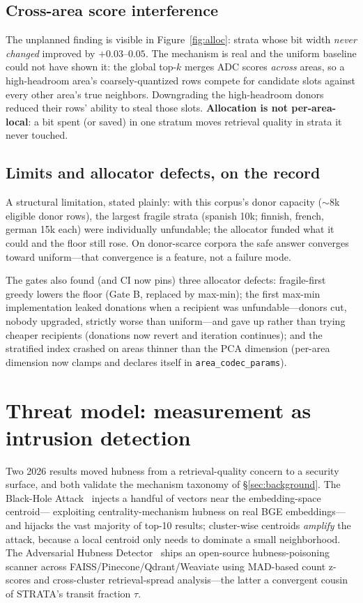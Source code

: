 \documentclass[sigconf, nonacm]{acmart}
\begin{document}
\subsection{Cross-area score interference}
\label{sec:interference}

The unplanned finding is visible in Figure~\ref{fig:alloc}: strata whose
bit width \emph{never changed} improved by $+0.03$--$0.05$. The mechanism
is real and the uniform baseline could not have shown it: the global
top-$k$ merges ADC scores \emph{across} areas, so a high-headroom area's
coarsely-quantized rows compete for candidate slots against every other
area's true neighbors. Downgrading the high-headroom donors reduced their
rows' ability to steal those slots. \textbf{Allocation is not
per-area-local}: a bit spent (or saved) in one stratum moves retrieval
quality in strata it never touched.

\subsection{Limits and allocator defects, on the record}

A structural limitation, stated plainly: with this corpus's donor capacity
(${\sim}8$k eligible donor rows), the largest fragile strata (spanish 10k;
finnish, french, german 15k each) were individually unfundable; the
allocator funded what it could and the floor still rose. On donor-scarce
corpora the safe answer converges toward uniform---that convergence is a
feature, not a failure mode.

The gates also found (and CI now pins) three allocator defects:
fragile-first greedy lowers the floor (Gate B, replaced by max-min); the
first max-min implementation leaked donations when a recipient was
unfundable---donors cut, nobody upgraded, strictly worse than uniform---and
gave up rather than trying cheaper recipients (donations now revert and
iteration continues); and the stratified index crashed on areas thinner
than the PCA dimension (per-area dimension now clamps and declares itself
in \texttt{area\_codec\_params}).

\section{Threat model: measurement as intrusion detection}
\label{sec:threat}

Two 2026 results moved hubness from a retrieval-quality concern to a
security surface, and both validate the mechanism taxonomy of
\S\ref{sec:background}. The Black-Hole Attack~\cite{blackhole2026}
injects a handful of vectors near the embedding-space centroid---%
exploiting centrality-mechanism hubness on real BGE embeddings---and
hijacks the vast majority of top-10 results; cluster-wise centroids
\emph{amplify} the attack, because a local centroid only needs to dominate
a small neighborhood. The Adversarial Hubness
Detector~\cite{advhubness2026} ships an open-source hubness-poisoning
scanner across FAISS/Pinecone/Qdrant/Weaviate using MAD-based count
z-scores and cross-cluster retrieval-spread analysis---the latter a
convergent cousin of STRATA's transit fraction $\tau$.
\end{document}
